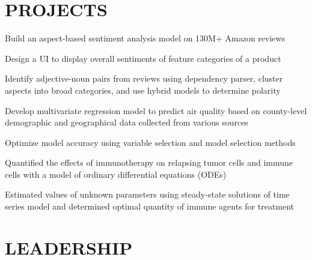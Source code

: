 \documentclass[]{deedy-resume-openfont}
\begin{document}
\begin{minipage}[t]{0.66\textwidth}
\begin{tightemize}
\end{tightemize}
\sectionsep


\section{PROJECTS}
\begin{tightemize}
\item Build an aspect-based sentiment analysis model on 130M+ Amazon reviews
\item Design a UI to display overall sentiments of feature categories of a product
\item Identify adjective-noun pairs from reviews using dependency parser, cluster aspects into broad categories, and use hybrid models to determine polarity
\end{tightemize}
\sectionsep

\begin{tightemize}
\item Develop multivariate regression model to predict air quality based on county-level demographic and geographical data collected from various sources
\item Optimize model accuracy using variable selection and model selection methods
\end{tightemize}
\sectionsep

\begin{tightemize}
\item Quantified the effects of immunotherapy on relapsing tumor cells and immune cells with a model of ordinary differential equations (ODEs) 
\item Estimated values of unknown parameters using steady-state solutions of time series model and determined optimal quantity of immune agents for treatment
\end{tightemize}
\sectionsep


\section{LEADERSHIP} 


\end{minipage}
\end{document}
